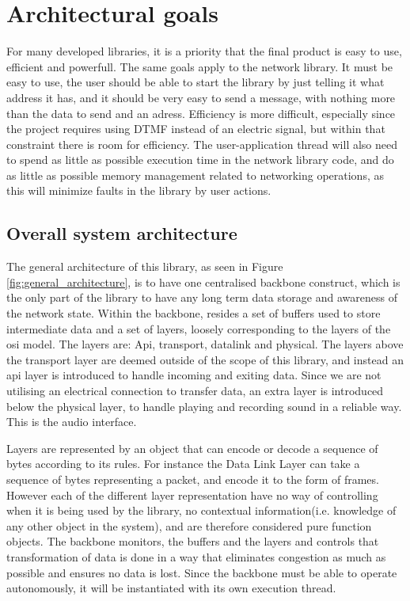 \section{Architectural goals}
For many developed libraries, it is a priority that the final product is easy to use, efficient and powerfull.  The same goals apply to the network library. It must be easy to use, the user should be able to start the library by just telling it what address it has, and it should be very easy to send a message, with nothing more than the data to send and an adress. Efficiency is more difficult, especially since the project requires using DTMF instead of an electric signal, but within that constraint there is room for efficiency.
The user-application thread will also need to spend as little as possible execution time in the network library code, and do as little as possible memory management related to networking operations, as this will minimize faults in the library by user actions.



\subsection{Overall system architecture}
The general architecture of this library, as seen in Figure \ref{fig:general_architecture}, is to have one centralised backbone construct, which is the only part of the library to have any long term data storage and awareness of the network state. 
Within the backbone, resides a set of buffers used to store intermediate data and a set of layers, loosely corresponding to the layers of the osi model.
The layers are: Api, transport, datalink and physical.
The layers above the transport layer are deemed outside of the scope of this library, and instead an api layer is introduced to handle incoming and exiting data. Since we are not utilising an electrical connection to transfer data, an extra layer is introduced below the physical layer, to handle playing and recording sound in a reliable way. This is the audio interface.









Layers are represented by an object that can encode or decode a sequence of bytes according to its rules. For instance the Data Link Layer can take a sequence of bytes representing a packet, and encode it to the form of frames.
However each of the different layer representation have no way of controlling when it is being used by the library, no contextual information(i.e. knowledge of any other object in the system), and are therefore considered pure function objects.
The backbone monitors, the buffers and the layers and controls that transformation of data is done in a way that eliminates congestion as much as possible and ensures no data is lost. Since the backbone must be able to operate autonomously, it will be instantiated with its own execution thread. 

